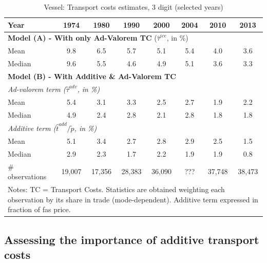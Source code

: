 \documentclass[a4paper,11pt]{article}
\begin{document}
\begin{table}[htbp]
  \centering
  \caption{Vessel: Transport costs estimates, 3 digit (selected years)}
\begin{center}
    \begin{tabular}{l|ccccccc}
   \hline\hline
Year         & 1974  & 1980  & 1990  & 2000  & 2004 & 2010  & 2013   \\
 \hline
   \multicolumn{8}{l}{\textbf{Model (A) - With only Ad-Valorem TC} ($\widehat{\tau}^{ice}$, in \%)}  \\
   \hline
Mean  & 9.8 & 6.5 & 5.7 & 5.1 & 5.4 & 4.0 & 3.6  \\
Median & 9.6 & 5.5 & 4.6 & 4.9 & 5.1  & 3.6 & 3.3  \\
\hline
\multicolumn{8}{l}{\textbf{Model (B) - With Additive \& Ad-Valorem TC}}    \\
\hline
\multicolumn{8}{l}{\textit{Ad-valorem term ($\widehat{\tau}^{adv}$, in \%)} } \\
\hline
Mean  & 5.4 & 3.1 & 3.3 & 2.5 & 2.7 & 1.9 & 2.2 \\
Median & 4.9 & 2.4 & 2.8 & 2.1 & 2.8 & 1.8 & 1.8  \\
\hline
\multicolumn{8}{l}{\textit{Additive term ($\widehat{t}^{add}/\widetilde{p}$, in \%)}}  \\
\hline
Mean  & 5.1 & 3.4 & 2.7 & 2.8 & 2.9 & 2.5 & 1.5  \\
Median & 2.9 & 2.3 & 1.7 & 2.2 & 1.9 & 1.9 & 0.8 \\
\hline
 \# observations & 19,007 & 17,356 & 28,383 & 36,090 & ??? & 37,748 & 38,473 \\
\hline\hline
\multicolumn{8}{l}{\parbox[l]{11cm}{ \vspace{7pt}\scriptsize{Notes: TC = Transport Costs. Statistics are obtained weighting each observation by its share in trade (mode-dependent). Additive term expressed in fraction of fas price.}}}
\end{tabular}%
\end{center} \label{tab:result_ves_3d_detail}
\end{table}%



\subsection{Assessing the importance of additive transport costs \label{app:diagnostic_test}}
\end{document}
